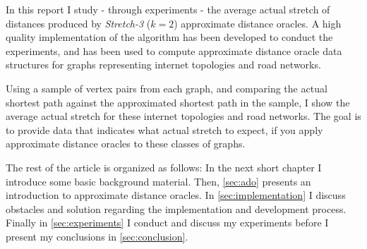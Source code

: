 In this report I study - through experiments - the average actual stretch of
distances produced by \emph{Stretch-3} ($k=2$) approximate distance oracles. A
high quality implementation of the algorithm has been developed to conduct
the experiments, and has been used to compute approximate distance oracle
data structures for graphs representing internet topologies and road networks.

Using a sample of vertex pairs from each graph, and comparing the actual
shortest path against the approximated shortest path in the sample, I show the
average actual stretch for these internet topologies and road networks. The
goal is to provide data that indicates what actual stretch to expect, if you
apply approximate distance oracles to these classes of graphs.

The rest of the article is organized as follows: In the next short chapter I
introduce some basic background material. Then, \autoref{sec:ado} presents an
introduction to approximate distance oracles. In \autoref{sec:implementation}
I discuss obstacles and solution regarding the implementation and development
process. Finally in \autoref{sec:experiments} I conduct and discuss my
experiments before I present my conclusions in \autoref{sec:conclusion}.
